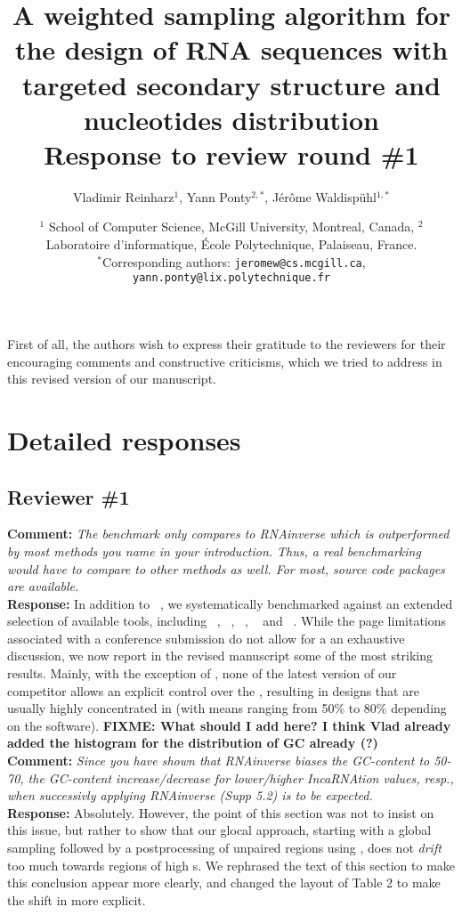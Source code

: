 \documentclass[11pt,hyperref,draft]{article} %
\title{A weighted sampling algorithm for the design of RNA sequences with targeted secondary structure and nucleotides distribution\\Response to review round \#1}
\author{Vladimir Reinharz$^1$, Yann Ponty$^{2,*}$, J\'er\^{o}me Waldisp\"{u}hl$^{1,*}$}
\date{$^1$ School of Computer Science, McGill University, Montreal, Canada, $^2$ Laboratoire d'informatique, \'Ecole Polytechnique, Palaiseau, France.\\ \small $^*$Corresponding authors: \texttt{jeromew@cs.mcgill.ca}, \texttt{yann.ponty@lix.polytechnique.fr}}
\newcommand{\Answer}[1]{\noindent\textsf{\textbf{Response: }}{\sf#1}\\}
\newcommand{\Comment}[1]{\noindent\textsf{\textbf{Comment: }}{\it#1}\\[.5em]}
\begin{document}
\maketitle

First of all, the authors wish to express their gratitude to the reviewers for their encouraging comments and constructive criticisms, which we tried to address in this revised version of our manuscript.


\section{Detailed responses}

\subsection{Reviewer \#1}

\Comment{The benchmark only compares to RNAinverse which is outperformed by most methods you name in your introduction. Thus, a real benchmarking would have to compare to other methods as well. For most, source code packages are available.}
\Answer{In addition to \RNAinverse~\cite{Hofacker:1994}, we systematically benchmarked \ourprog against an extended selection of available tools, including \NUPACK~\cite{Zadeh:2011fk}, \frankenstein~\cite{Lyngso:2012vn}, \RNASSD~\cite{Aguirre-Hernandez:2007kx}, \INFORNA~\cite{Busch:2006uq} and \RNAexinv~\cite{Avihoo:2011fk}. While the page limitations associated with a conference submission do not allow for a an exhaustive discussion, we now report in the revised manuscript some of the most striking results. Mainly, with the exception of \RNASSD, none of the latest version of our competitor allows an explicit control over the \GCContent, resulting in designs that are usually highly concentrated in \GCContent (with means ranging from 50\% to 80\% depending on the software). \textbf{FIXME: What should I add here? I think Vlad already added the histogram for the distribution of GC already (?)}
}

\Comment{Since you have shown that RNAinverse biases the GC-content to 50-70, the GC-content increase/decrease for lower/higher IncaRNAtion values, resp., when successivly applying RNAinverse (Supp 5.2) is to be expected.}
\Answer{Absolutely. However, the point of this section was not to insist on this issue, but rather to show that our glocal approach, starting with a global sampling followed by a postprocessing of unpaired regions using \RNAinverse, does not {\em drift} too much towards regions of high \GCContent{}s. We rephrased the text of this section to make this conclusion appear more clearly, and changed the layout of Table 2 to make the shift in \GC more explicit.}
\end{document}
